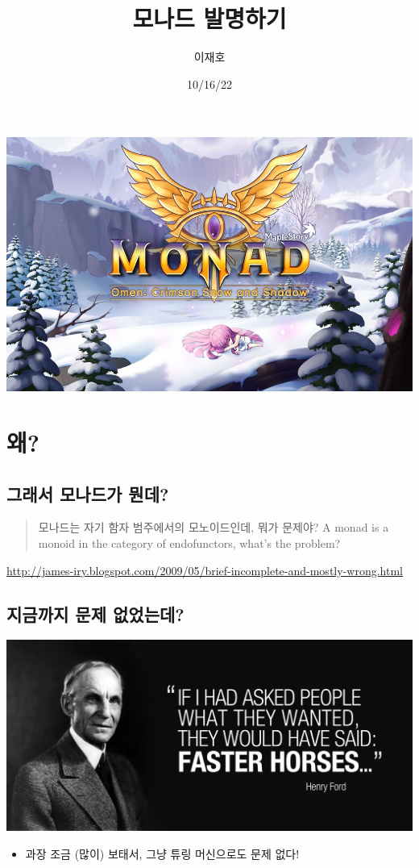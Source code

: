 \documentclass[a4paper,11pt]{article}
\author{이재호}
\date{10/16/22}
\title{모나드 발명하기}
\begin{document}
\maketitle
\tableofcontents

\begin{center}
\includegraphics[width=.9\linewidth]{./monad.jpeg}
\end{center}

\section{왜?}
\label{sec:org0ae2cd8}
\subsection{그래서 모나드가 뭔데?}
\label{sec:org3fb5b61}
\begin{quote}
모나드는 자기 함자 범주에서의 모노이드인데, 뭐가 문제야?
A monad is a monoid in the category of endofunctors, what's the problem?
\end{quote}
\url{http://james-iry.blogspot.com/2009/05/brief-incomplete-and-mostly-wrong.html}


\subsection{지금까지 문제 없었는데?}
\label{sec:org0da5715}
\begin{center}
\includegraphics[width=.9\linewidth]{./faster-horse.jpg}
\end{center}
\begin{itemize}
\item 과장 조금 (많이) 보태서, 그냥 튜링 머신으로도 문제 없다!
\end{itemize}
\end{document}
